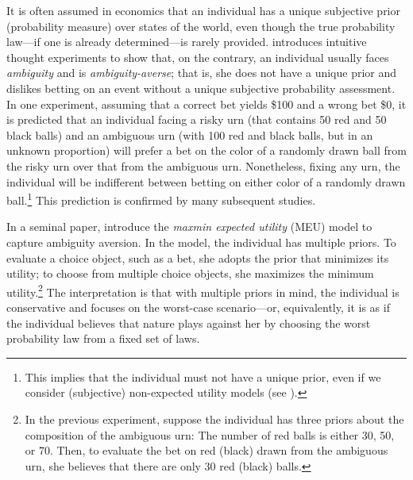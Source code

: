 \documentclass[12pt, notitlepage]{article}
\begin{document}
\label{intro}It is often assumed in economics that an individual has a
unique subjective prior (probability measure) over states of the world, even
though the true probability law---if one is already determined---is rarely
provided. \cite{Ellsberg61} introduces intuitive thought experiments to show
that, on the contrary, an individual usually faces \textit{ambiguity} and is 
\textit{ambiguity-averse}; that is, she does not have a unique prior and
dislikes betting on an event without a unique subjective probability
assessment. In one experiment, assuming that a correct bet yields \$100 and
a wrong bet \$0, it is predicted that an individual facing a risky urn (that
contains 50 red and 50 black balls) and an ambiguous urn (with 100 red and
black balls, but in an unknown proportion) will prefer a bet on the color of
a randomly drawn ball from the risky urn over that from the ambiguous urn.
Nonetheless, fixing any urn, the individual will be indifferent between
betting on either color of a randomly drawn ball.\footnote{%
This implies that the individual must not have a unique prior, even if we
consider (subjective) non-expected utility models (see \cite%
{MachinaSchmeidler92}).} This prediction is confirmed by many subsequent
studies.

In a seminal paper, \cite{GilboaSchmeidler89} introduce the \textit{maxmin
expected utility} (MEU) model to capture ambiguity aversion. In the model,
the individual has multiple priors. To evaluate a choice object, such as a
bet, she adopts the prior that minimizes its utility; to choose from
multiple choice objects, she maximizes the minimum utility.\footnote{%
In the previous experiment, suppose the individual has three priors about
the composition of the ambiguous urn: The number of red balls is either 30,
50, or 70. Then, to evaluate the bet on red (black) drawn from the ambiguous
urn, she believes that there are only 30 red (black) balls.} The
interpretation is that with multiple priors in mind, the individual is
conservative and focuses on the worst-case scenario---or, equivalently, it
is as if the individual believes that nature plays against her by choosing
the worst probability law from a fixed set of laws.
\end{document}
